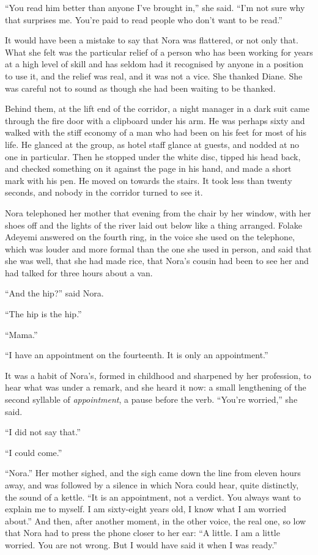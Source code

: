 ``You read him better than anyone I've brought in,'' she said. ``I'm not sure why that surprises me. You're paid to read people who don't want to be read.''

It would have been a mistake to say that Nora was flattered, or not only that. What she felt was the particular relief of a person who has been working for years at a high level of skill and has seldom had it recognised by anyone in a position to use it, and the relief was real, and it was not a vice. She thanked Diane. She was careful not to sound as though she had been waiting to be thanked.

Behind them, at the lift end of the corridor, a night manager in a dark suit came through the fire door with a clipboard under his arm. He was perhaps sixty and walked with the stiff economy of a man who had been on his feet for most of his life. He glanced at the group, as hotel staff glance at guests, and nodded at no one in particular. Then he stopped under the white disc, tipped his head back, and checked something on it against the page in his hand, and made a short mark with his pen. He moved on towards the stairs. It took less than twenty seconds, and nobody in the corridor turned to see it.

Nora telephoned her mother that evening from the chair by her window, with her shoes off and the lights of the river laid out below like a thing arranged. Folake Adeyemi answered on the fourth ring, in the voice she used on the telephone, which was louder and more formal than the one she used in person, and said that she was well, that she had made rice, that Nora's cousin had been to see her and had talked for three hours about a van.

``And the hip?'' said Nora.

``The hip is the hip.''

``Mama.''

``I have an appointment on the fourteenth. It is only an appointment.''

It was a habit of Nora's, formed in childhood and sharpened by her profession, to hear what was under a remark, and she heard it now: a small lengthening of the second syllable of \emph{appointment}, a pause before the verb. ``You're worried,'' she said.

``I did not say that.''

``I could come.''

``Nora.'' Her mother sighed, and the sigh came down the line from eleven hours away, and was followed by a silence in which Nora could hear, quite distinctly, the sound of a kettle. ``It is an appointment, not a verdict. You always want to explain me to myself. I am sixty-eight years old, I know what I am worried about.'' And then, after another moment, in the other voice, the real one, so low that Nora had to press the phone closer to her ear: ``A little. I am a little worried. You are not wrong. But I would have said it when I was ready.''


